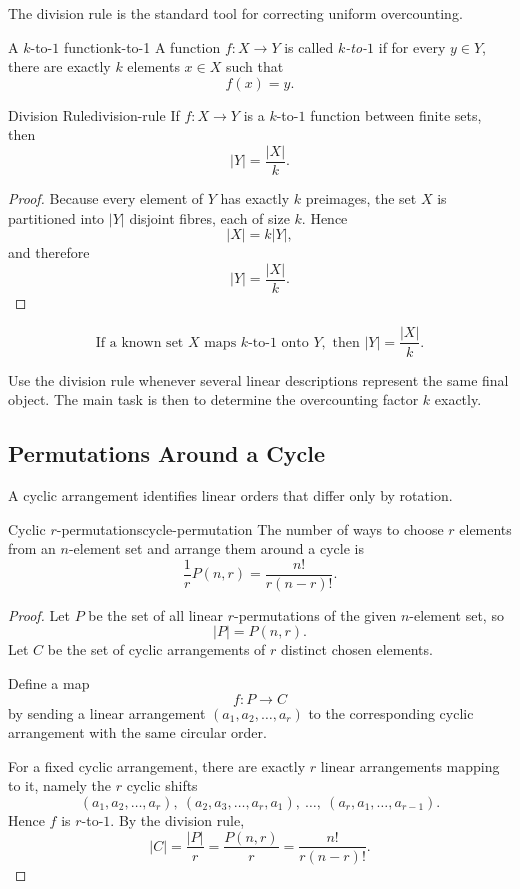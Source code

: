 The division rule is the standard tool for correcting uniform overcounting.

\begin{definition}{A $k$-to-$1$ function}{k-to-1}
A function $f:X\to Y$ is called \emph{$k$-to-$1$} if for every $y\in Y$, there are exactly $k$ elements $x\in X$ such that
\[
f(x)=y.
\]
\end{definition}

\begin{theorem}{Division Rule}{division-rule}
If $f:X\to Y$ is a $k$-to-$1$ function between finite sets, then
\[
|Y|=\frac{|X|}{k}.
\]
\end{theorem}

\begin{proof}
Because every element of $Y$ has exactly $k$ preimages, the set $X$ is partitioned into $|Y|$ disjoint fibres, each of size $k$. Hence
\[
|X|=k|Y|,
\]
and therefore
\[
|Y|=\frac{|X|}{k}.
\]
\end{proof}

\begin{keyformula}[title={Division rule}]
\[
\text{If a known set }X\text{ maps }k\text{-to-}1\text{ onto }Y,\text{ then }|Y|=\frac{|X|}{k}.
\]
\end{keyformula}

\begin{examtip}[title={When the division rule appears}]
Use the division rule whenever several linear descriptions represent the same final object. The main task is then to determine the overcounting factor $k$ exactly.
\end{examtip}

\subsection{Permutations Around a Cycle}

A cyclic arrangement identifies linear orders that differ only by rotation.

\begin{theorem}{Cyclic $r$-permutations}{cycle-permutation}
The number of ways to choose $r$ elements from an $n$-element set and arrange them around a cycle is
\[
\frac{1}{r}P(n,r)=\frac{n!}{r(n-r)!}.
\]
\end{theorem}

\begin{proof}
Let $P$ be the set of all linear $r$-permutations of the given $n$-element set, so
\[
|P|=P(n,r).
\]
Let $C$ be the set of cyclic arrangements of $r$ distinct chosen elements.

Define a map
\[
f:P\to C
\]
by sending a linear arrangement $(a_1,a_2,\dots,a_r)$ to the corresponding cyclic arrangement with the same circular order.

For a fixed cyclic arrangement, there are exactly $r$ linear arrangements mapping to it, namely the $r$ cyclic shifts
\[
(a_1,a_2,\dots,a_r),\ (a_2,a_3,\dots,a_r,a_1),\ \dots,\ (a_r,a_1,\dots,a_{r-1}).
\]
Hence $f$ is $r$-to-$1$. By the division rule,
\[
|C|=\frac{|P|}{r}=\frac{P(n,r)}{r}=\frac{n!}{r(n-r)!}.
\]
\end{proof}

